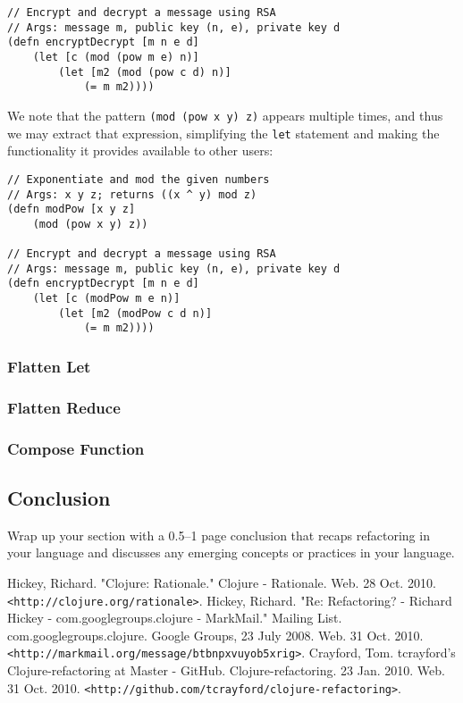 \documentclass{article}
\begin{document}
\begin{verbatim}
// Encrypt and decrypt a message using RSA
// Args: message m, public key (n, e), private key d
(defn encryptDecrypt [m n e d]
    (let [c (mod (pow m e) n)]
        (let [m2 (mod (pow c d) n)]
            (= m m2))))
\end{verbatim}

We note that the pattern \verb!(mod (pow x y) z)! appears multiple times, and thus we may extract that expression, simplifying the \verb!let! statement and making the functionality it provides available to other users:

\begin{verbatim}
// Exponentiate and mod the given numbers
// Args: x y z; returns ((x ^ y) mod z)
(defn modPow [x y z]
    (mod (pow x y) z))

// Encrypt and decrypt a message using RSA
// Args: message m, public key (n, e), private key d
(defn encryptDecrypt [m n e d]
    (let [c (modPow m e n)]
        (let [m2 (modPow c d n)]
            (= m m2))))
\end{verbatim}

\subsubsection{Flatten Let}

\subsubsection{Flatten Reduce}

\subsubsection{Compose Function}

\subsection{Conclusion}

Wrap up your section with a 0.5--1 page conclusion that recaps refactoring in your language and discusses any emerging concepts or practices in your language.

\begin{thebibliography}{9}
 Hickey, Richard. "Clojure: Rationale." Clojure - Rationale. Web. 28 Oct. 2010. \verb!<http://clojure.org/rationale>!.
 Hickey, Richard. "Re: Refactoring? - Richard Hickey - com.googlegroups.clojure - MarkMail." Mailing List. com.googlegroups.clojure. Google Groups, 23 July 2008. Web. 31 Oct. 2010. \verb!<http://markmail.org/message/btbnpxvuyob5xrig>!.
 Crayford, Tom. tcrayford's Clojure-refactoring at Master - GitHub. Clojure-refactoring. 23 Jan. 2010. Web. 31 Oct. 2010. \verb!<http://github.com/tcrayford/clojure-refactoring>!.
\end{thebibliography}
\end{document}
